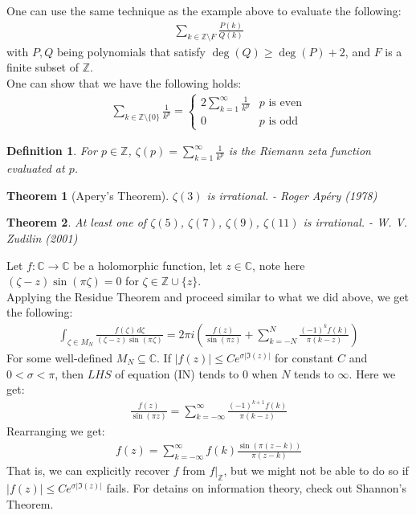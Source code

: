 \documentclass[11pt,oneside]{book}
\theoremstyle{break}
\theoremstyle{break}
\newtheorem{thm}{Theorem}[section]
\newtheorem{defn}{Definition}[corL]
\newcommand{\Z}{\mathbb{Z}}
\newcommand{\Complex}{\mathbb{C}}
\begin{document}
\hfill\break\hfill\break
One can use the same technique as the example above to evaluate the following:
\begin{align*}
\sum_{k \in \Z \setminus F} \frac{P(k)}{Q(k)}
\end{align*}
with $P, Q$ being polynomials that satisfy $\deg(Q) \geq \deg(P) + 2$, and $F$ is a finite subset of $\Z$. \\

One can show that we have the following holds:
\begin{align*}
\sum_{k \in \Z\setminus\{0\}}\frac{1}{k^p} = \begin{cases}2\sum_{k=1}^\infty \frac{1}{k^p} & p \text{ is even} \\ 0 & p\text{ is odd} \end{cases}
\end{align*}
\begin{defn}
For $p \in \Z$, $\zeta (p) = \sum_{k=1}^\infty \frac{1}{k^p}$ is the Riemann zeta function evaluated at $p$.
\end{defn}
\begin{thm}[Apery's Theorem]
$\zeta(3)$ is irrational. \hfill - Roger Apéry (1978)
\end{thm}
\begin{thm}
At least one of $\zeta(5)$, $\zeta(7)$, $\zeta(9)$, $\zeta(11)$ is irrational.  \hfill - W. V. Zudilin (2001)
\end{thm}
\newpage

Let $f:\Complex \to \Complex$ be a holomorphic function, let $z \in \Complex$, note here $(\zeta - z) \sin(\pi \zeta) = 0$ for $\zeta \in \Z\cup\{z\}$. \\
Applying the Residue Theorem and proceed similar to what we did above, we get the following:
\begin{align*}
\int_{\zeta \in M_N}\frac{f(\zeta)\, d\zeta}{(\zeta - z) \sin(\pi \zeta)} = 2\pi i \left(\frac{f(z)}{\sin(\pi z)}+\sum_{k = -N}^{N} \frac{(-1)^k f(k)}{\pi (k-z)} \right)\tag{IN}
\end{align*}
For some well-defined $M_N \subseteq \Complex$. If $|f(z)|\leq C e^{\sigma |\Im(z)|}$ for constant $C$ and $0 < \sigma < \pi$, then $LHS $ of equation (IN) tends to $0$ when $N$ tends to $\infty$. Here we get:
\begin{align*}
\frac{f(z)}{\sin(\pi z) } = \sum_{k=-\infty}^{\infty}\frac{(-1)^{k+1}f(k)}{\pi (k - z)}
\end{align*} 
Rearranging we get:
\begin{align*}
f(z) = \sum_{k=-\infty}^{\infty} f(k) \frac{\sin(\pi (z-k))}{\pi (z-k)}
\end{align*}
That is, we can explicitly recover $f$ from $f|_{\Z}$, but we might not be able to do so if $|f(z)|\leq C e^{\sigma |\Im(z)|}$ fails. For detains on information theory, check out Shannon's Theorem.
\end{document}
